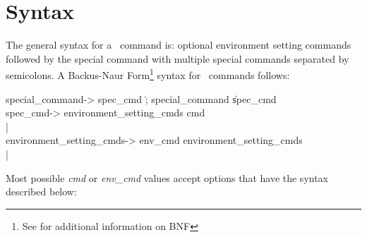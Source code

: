 \section{Syntax}
The general syntax for a \Special\ command is: optional environment
setting commands followed by the special command with multiple special
commands separated by semicolons. A Backus-Naur Form\footnote{See
\cite{aho:compilers} for additional information on BNF} syntax for
\Special\ commands follows:
\begin{BNF}
special_command-> spec_cmd \.; special_command \| spec_cmd\\
spec_cmd-> environment_setting_cmds cmd\\
         | \e\\
environment_setting_cmds-> env_cmd environment_setting_cmds\\
         | \e\\
\end{BNF}
Most possible {\it cmd\/} or {\it env\_cmd} values accept options
that have the syntax described below:
